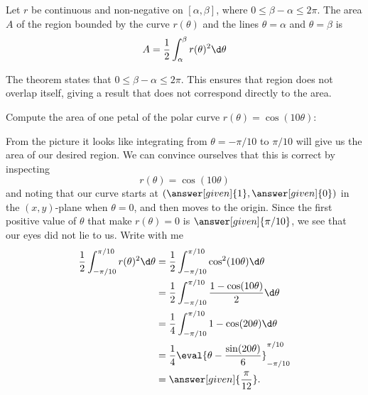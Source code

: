 \documentclass{ximera}
\begin{document}
\begin{theorem}
Let $r$ be continuous and non-negative on $[\alpha,\beta]$, where
$0\leq \beta-\alpha\leq 2\pi$. The area $A$ of the region bounded by
the curve $r(\theta)$ and the lines $\theta=\alpha$ and
$\theta=\beta$ is
\[
A  =  \frac12\int_\alpha^\beta r(\theta)^2 \d \theta  
\]
\end{theorem}

The theorem states that $0\leq \beta-\alpha\leq 2\pi$. This ensures
that region does not overlap itself, giving a result that does not
correspond directly to the area.


\begin{example}
  Compute the area of one petal of the polar curve $r(\theta) =
  \cos(10\theta)$:
  \begin{image}
  \end{image}
  \begin{explanation}
    From the picture it looks like integrating from
    $\theta=-\pi/10$ to $\pi/10$ will give us the area
      of our desired region. We can convince ourselves that this is
      correct by inspecting
      \[
      r(\theta) = \cos(10\theta)
      \]
      and noting that our curve starts at
      $(\answer[given]{1},\answer[given]{0})$ in the $(x,y)$-plane
      when $\theta=0$, and then moves to the origin. Since the first
      positive value of $\theta$ that make $r(\theta)= 0$ is
      $\answer[given]{\pi/10}$, we see that our eyes did not lie to
      us. Write with me
      \begin{align*}
      \frac{1}{2}\int_{-\pi/10}^{\pi/10} r(\theta)^2 \d \theta &= \frac{1}{2}\int_{-\pi/10}^{\pi/10} \cos^2(10\theta) \d \theta\\
      &= \frac{1}{2}\int_{-\pi/10}^{\pi/10} \frac{1-\cos(10\theta)}{2} \d \theta\\
      &= \frac{1}{4}\int_{-\pi/10}^{\pi/10} 1-\cos(20\theta) \d \theta\\
      &= \frac{1}{4}\eval{\theta-\frac{\sin(20\theta)}{6}}_{-\pi/10}^{\pi/10}\\
      &= \answer[given]{\frac{\pi}{12}}.
      \end{align*}
  \end{explanation}
\end{example}
\end{document}
